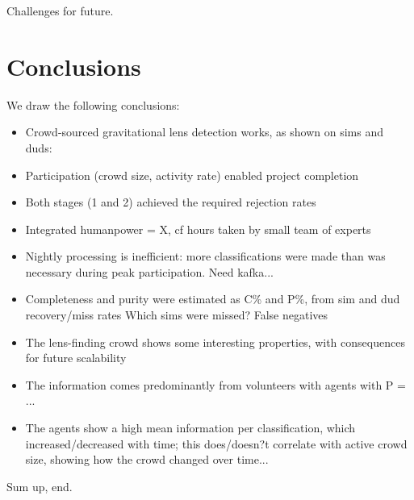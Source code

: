 \documentclass[useAMS,usenatbib,a4paper]{mn2e}
\begin{document}
Challenges for future.


\section{Conclusions}
\label{sec:conclude}

We draw the following conclusions:

\begin{itemize} 

\item Crowd-sourced gravitational lens detection works, as shown on sims and duds:

\item Participation (crowd size, activity rate) enabled project completion

\item Both stages (1 and 2) achieved the required rejection rates

\item Integrated humanpower = X, cf hours taken by small team of experts 

\item Nightly processing is inefficient: more classifications were made than
was necessary during peak participation. Need kafka...

\item Completeness and purity were estimated as C\% and P\%, from sim and dud
recovery/miss rates Which sims were missed? False negatives

\item The lens-finding crowd shows some interesting properties, with
consequences for future scalability

\item The information comes predominantly from volunteers with agents with P =
...

\item The agents show a high mean information per classification, which
increased/decreased with time; this does/doesn?t correlate with active crowd
size, showing how the crowd changed over time...

\end{itemize}

Sum up, end.

\end{document}
